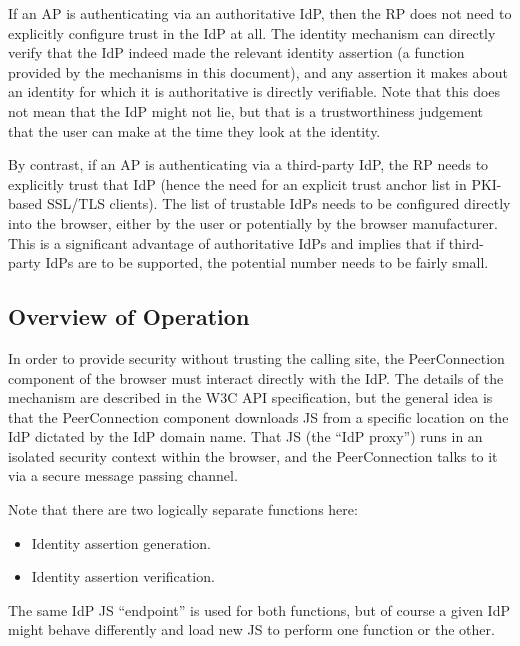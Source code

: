 \documentclass{article}
\begin{document}
If an AP is authenticating via an authoritative IdP, then the RP does
not need to explicitly configure trust in the IdP at all.  The
identity mechanism can directly verify that the IdP indeed made the
relevant identity assertion (a function provided by the mechanisms in
this document), and any assertion it makes about an identity for
which it is authoritative is directly verifiable.  Note that this
does not mean that the IdP might not lie, but that is a
trustworthiness judgement that the user can make at the time they
look at the identity.

By contrast, if an AP is authenticating via a third-party IdP, the RP
needs to explicitly trust that IdP (hence the need for an explicit
trust anchor list in PKI-based SSL/TLS clients).  The list of
trustable IdPs needs to be configured directly into the browser,
either by the user or potentially by the browser manufacturer.  This
is a significant advantage of authoritative IdPs and implies that if
third-party IdPs are to be supported, the potential number needs to
be fairly small.

\subsection{Overview of Operation}

In order to provide security without trusting the calling site, the
PeerConnection component of the browser must interact directly with
the IdP.  The details of the mechanism are described in the W3C API
specification, but the general idea is that the PeerConnection
component downloads JS from a specific location on the IdP dictated
by the IdP domain name.  That JS (the ``IdP proxy'') runs in an
isolated security context within the browser, and the PeerConnection
talks to it via a secure message passing channel.

Note that there are two logically separate functions here:

\begin{itemize}
\item Identity assertion generation.

\item Identity assertion verification.
\end{itemize}

The same IdP JS ``endpoint'' is used for both functions, but of course
a given IdP might behave differently and load new JS to perform one
function or the other.
\end{document}
